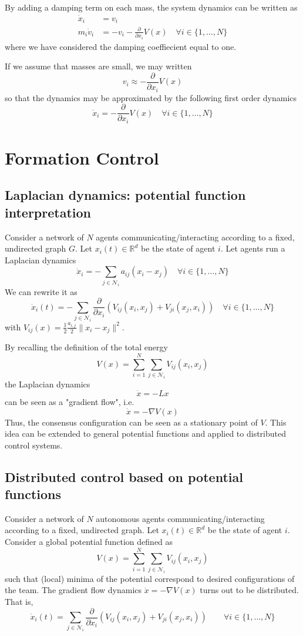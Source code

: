 \documentclass{book}
\newcommand{\R}{\mathbb{R}}
\theoremstyle{theoremv2}
\theoremstyle{defv2}
\theoremstyle{remark}
\theoremstyle{remark}
\theoremstyle{definition}
\theoremstyle{definition}
\begin{document}
By adding a damping term on each mass, the system dynamics can be written as 
\begin{align*}
    \dot{x}_i &= v_i\\
    m_i\dot{v}_i &= -v_i - \displaystyle\frac{\partial}{\partial x_i}V(x) \quad \forall i \in \{ 1,\dots,N \}
\end{align*}
where we have considered the damping coeffiecient equal to one. 

If we assume that masses are small, we may written
\[
    v_i \approx - \displaystyle\frac{\partial}{\partial x_i} V(x)
\]
so that the dynamics may be approximated by the following first order dynamics
\[
    \dot{x}_i = - \displaystyle\frac{\partial}{\partial x_i}V(x) \quad \forall i\in\{ 1,\dots,N \}
\]

\section{Formation Control}
\subsection{Laplacian dynamics: potential function interpretation}
Consider a network of $N$ agents communicating/interacting according to a fixed, undirected graph $G$. Let $x_i(t)\in\R^d$ be the state of agent $i$. Let agents run a Laplacian dynamics
\[
    \dot{x}_i = - \displaystyle\sum_{j\in\mathcal{N}_i}a_{ij}(x_i-x_j) \quad \forall i\in\{ 1,\dots,N \}
\]
We can rewrite it as 
\[
    \dot{x}_i(t) = - \displaystyle\sum_{j\in \mathcal{N}_i} \displaystyle\frac{\partial}{\partial x_i}\left(V_{ij}(x_i,x_j)+V_{ji}(x_j,x_i)\right) \quad \forall i \in \{ 1,\dots,N \}
\]
with $V_{ij}(x) = \displaystyle\frac{1}{2}\displaystyle\frac{a_{i,j}}{2}\|x_i-x_j\|^2$.

By recalling the definition of the total energy
\[
    V(x)=\displaystyle\sum_{i=1}^{N}\displaystyle\sum_{j\in\mathcal{N}_i}V_{ij}(x_i,x_j)
\]
the Laplacian dynamics 
\[
    \dot{x} = -Lx
\]
can be seen as a "gradient flow", i.e. 
\[
    \dot{x} = -\nabla V(x)
\]
Thus, the consensus configuration can be seen as a stationary point of $V$. This idea can be extended to general potential functions and applied to distributed control systems.

\subsection{Distributed control based on potential functions}
Consider a network of $N$ autonomous agents communicating/interacting according to a fixed, undirected graph. Let $x_i(t)\in\R^d$ be the state of agent $i$. Consider a global potential function defined as 
\[
    V(x)=\displaystyle\sum_{i=1}^{N}\displaystyle\sum_{j\in\mathcal{N}_i}V_{ij}(x_i,x_j)
\]
such that (local) minima of the potential correspond to desired configurations of the team. The gradient flow dynamics $\dot{x} = -\nabla V(x)$ turns out to be distributed. That is,
 \[
     \dot{x}_i(t) = \displaystyle\sum_{j\in\mathcal{N}_i}\displaystyle\frac{\partial}{\partial x_i}\left(V_{ij}(x_i,x_j)+V_{ji}(x_j,x_i)\right) \qquad \forall i \in \{ 1,\dots,N \}
 \]
\end{document}
